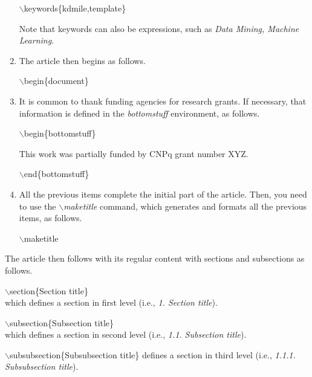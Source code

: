 \documentclass[kdmile,a4paper]{kdmile} %
\newenvironment{latexcode}
{\ttfamily\vspace{0.1in}\setlength{\parindent}{18pt}}
{\vspace{0.1in}}
\begin{document}
\begin{enumerate}
	\begin{latexcode}
		$\backslash$keywords\{kdmile,template\}
	\end{latexcode}

	Note that keywords can also be expressions, such as \textit{Data Mining, Machine Learning}.

	\item The article then begins as follows.
	
	\begin{latexcode}
	   $\backslash$begin\{document\}
	\end{latexcode}
	
	\item It is common to thank funding agencies for research grants. If necessary, that information is defined in the \textit{bottomstuff} environment, as follows.
	
	\begin{latexcode}
		$\backslash$begin\{bottomstuff\}
	
		This work was partially funded by CNPq grant number XYZ. 
	
		$\backslash$end\{bottomstuff\}	
	\end{latexcode}
	
	\item All the previous items complete the initial part of the article. Then, you need to use the \textit{$\backslash$maketitle} command, which generates and formats all the previous items, as follows.
	
		\begin{latexcode}
	   $\backslash$maketitle
	\end{latexcode}
\end{enumerate}


The article then follows with its regular content with sections and subsections as follows.

	\begin{latexcode}
		$\backslash$section\{Section title\} \\
		\rmfamily which defines a section in first level (i.e., \textit{1. Section title}).
	
		\ttfamily$\backslash$subsection\{Subsection title\} \\
		\rmfamily which defines a section in second level (i.e., \textit{1.1. Subsection title}).
	
		\ttfamily$\backslash$subsubsection\{Subsubsection title\} 
		\rmfamily defines a section in third level (i.e., \textit{1.1.1. Subsubsection title}).
	\end{latexcode}
\end{document}
